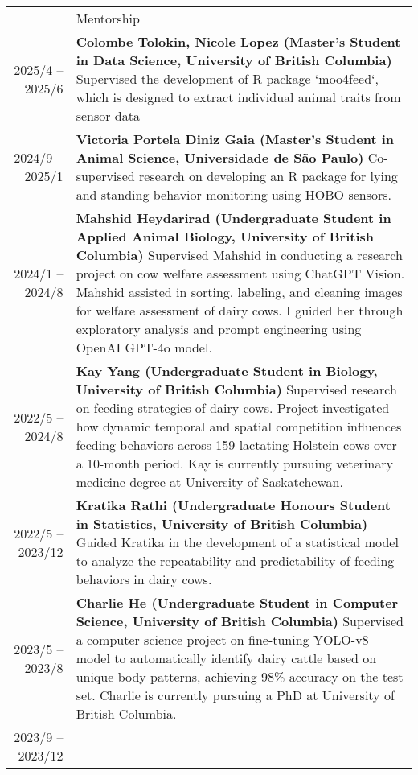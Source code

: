 \documentclass[letterpaper, 11pt]{article}
\newcommand{\headingfont}{\Large\color{OliveGreen}}
\newenvironment{SectionTable}[1]{
	\renewcommand*{\arraystretch}{1.7}
	\setlength{\tabcolsep}{10pt}
	\begin{longtable}{Rp{5.2in}} & #1 \\}
{\end{longtable}\vspace{-.3cm}}
\begin{document}
\begin{SectionTable}{\headingfont Mentorship}
2025/4 -- 2025/6 &
\textbf{Colombe Tolokin, Nicole Lopez (Master's Student in Data Science, University of British Columbia)} \newline
Supervised the development of R package `moo4feed`, which is designed to extract individual animal traits from sensor data\\
2024/9 -- 2025/1 &
\textbf{Victoria Portela Diniz Gaia (Master's Student in Animal Science, Universidade de São Paulo)} \newline
Co-supervised research on developing an R package for lying and standing behavior monitoring using HOBO sensors. \\
2024/1 -- 2024/8 &
\textbf{Mahshid Heydarirad (Undergraduate Student in Applied Animal Biology, University of British Columbia)} \newline
Supervised Mahshid in conducting a research project on cow welfare assessment using ChatGPT Vision. Mahshid assisted in sorting, labeling, and cleaning images for welfare assessment of dairy cows. I guided her through exploratory analysis and prompt engineering using OpenAI GPT-4o model. \\
2022/5 -- 2024/8 &
\textbf{Kay Yang (Undergraduate Student in Biology, University of British Columbia)} \newline
Supervised research on feeding strategies of dairy cows. Project investigated how dynamic temporal and spatial competition influences feeding behaviors across 159 lactating Holstein cows over a 10-month period. Kay is currently pursuing veterinary medicine degree at University of Saskatchewan. \\
2022/5 -- 2023/12 &
\textbf{Kratika Rathi (Undergraduate Honours Student in Statistics, University of British Columbia)} \newline
Guided Kratika in the development of a statistical model to analyze the repeatability and predictability of feeding behaviors in dairy cows. \\
2023/5 -- 2023/8 &
\textbf{Charlie He (Undergraduate Student in Computer Science, University of British Columbia)} \newline
Supervised a computer science project on fine-tuning YOLO-v8 model to automatically identify dairy cattle based on unique body patterns, achieving 98\% accuracy on the test set. Charlie is currently pursuing a PhD at University of British Columbia. \\
2023/9 -- 2023/12 &

\end{SectionTable}
\end{document}
